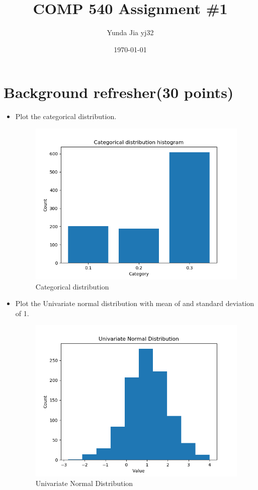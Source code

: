 \documentclass{article}
\title{COMP 540 Assignment \#1}
\author{Yunda Jia yj32}
\date{\today}
\begin{document}
\maketitle

\section{Background refresher(30 points)}
\begin{itemize}
	\item Plot the categorical distribution.\\
\begin{figure}[h!]
	\centering
	\includegraphics[scale = 0.8]{Categorical_distribution.png}
	\caption{Categorical distribution}
\end{figure}

\item Plot the Univariate normal distribution with mean of and standard deviation of 1.\\
\begin{figure}[h!]
	\centering
	\includegraphics[scale = 0.8]{Univariate_distribution.png}
	\caption{Univariate Normal Distribution}
\end{figure}\\


\end{itemize}
\end{document}
